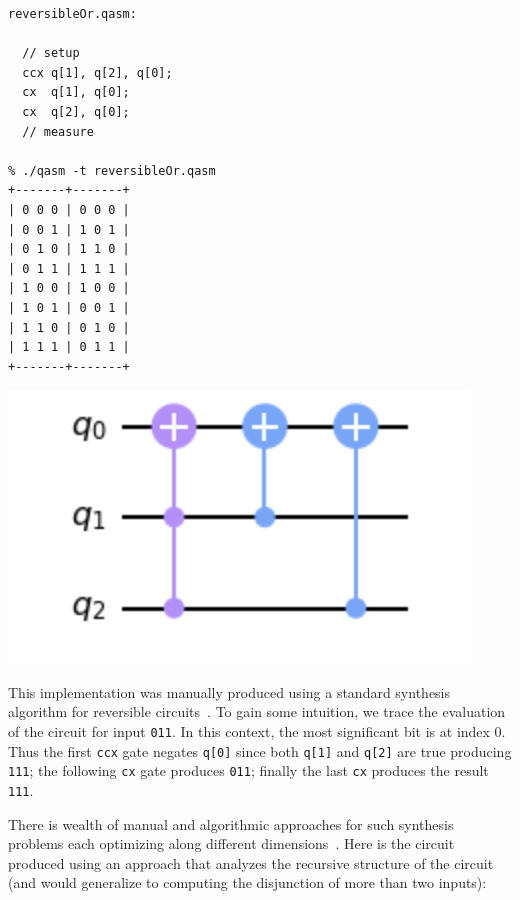 \begin{center}
  \begin{minipage}[c]{0.4\linewidth}
\begin{verbatim}
reversibleOr.qasm:

  // setup
  ccx q[1], q[2], q[0];
  cx  q[1], q[0];
  cx  q[2], q[0];
  // measure

% ./qasm -t reversibleOr.qasm
+-------+-------+
| 0 0 0 | 0 0 0 |
| 0 0 1 | 1 0 1 |
| 0 1 0 | 1 1 0 |
| 0 1 1 | 1 1 1 |
| 1 0 0 | 1 0 0 |
| 1 0 1 | 0 0 1 |
| 1 1 0 | 0 1 0 |
| 1 1 1 | 0 1 1 |
+-------+-------+
  \end{verbatim}
  \end{minipage}
  \qquad
  \includegraphics[scale=0.7]{reversibleOr.png}
\end{center}

\noindent This implementation was manually produced using a standard synthesis algorithm for reversible
circuits~\cite{10.1145/775832.775915}. To gain some intuition, we trace the evaluation of the circuit for input
\verb|011|. In this context, the most significant bit is at index 0. Thus the first \verb|ccx| gate negates \verb|q[0]|
since both \verb|q[1]| and \verb|q[2]| are true producing \verb|111|; the following \verb|cx| gate produces \verb|011|; finally the last \verb|cx| produces the result \verb|111|.

There is wealth of manual and algorithmic approaches for such synthesis problems each optimizing along  different dimensions~\cite{maslov:2003:rls:1087512,1201583}. Here is the circuit produced using an approach that analyzes the recursive structure of the circuit (and would generalize to computing the disjunction of more than two inputs):

